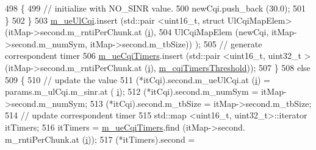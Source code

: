 \begin{DoxyCode}
498                                                 \{
499                                                         \textcolor{comment}{// initialize with NO\_SINR value.}
500                                                         newCqi.push\_back (30.0);
501                                                 \}
502                                         \}
503                                         \hyperlink{classns3_1_1MmWaveFlexTtiMaxRateMacScheduler_a6f9a468f0c48b60d9893fed1410d18cd}{m\_ueUlCqi}.insert (std::pair <uint16\_t, struct
       UlCqiMapElem> (itMap->second.m\_rntiPerChunk.at (\hyperlink{bernuolliDistribution_8m_a6f6ccfcf58b31cb6412107d9d5281426}{i}),
504                                                                                                      
      UlCqiMapElem (newCqi, itMap->second.m\_numSym, itMap->second.m\_tbSize)) );
505                                         \textcolor{comment}{// generate correspondent timer}
506                                         \hyperlink{classns3_1_1MmWaveFlexTtiMaxRateMacScheduler_ae82085e6dfdc301971569ea50a4eadd0}{m\_ueCqiTimers}.insert (std::pair <uint16\_t, uint32\_t > 
      (itMap->second.m\_rntiPerChunk.at (\hyperlink{bernuolliDistribution_8m_a6f6ccfcf58b31cb6412107d9d5281426}{i}), \hyperlink{classns3_1_1MmWaveFlexTtiMaxRateMacScheduler_a7f29b65f1e4a7c64cf73fe2efd02770f}{m\_cqiTimersThreshold}));
507                                 \}
508                                 \textcolor{keywordflow}{else}
509                                 \{
510                                         \textcolor{comment}{// update the value}
511                                         (*itCqi).second.m\_ueUlCqi.at (\hyperlink{bernuolliDistribution_8m_a6f6ccfcf58b31cb6412107d9d5281426}{i}) = params.m\_ulCqi.m\_sinr.at (
      \hyperlink{bernuolliDistribution_8m_a6f6ccfcf58b31cb6412107d9d5281426}{i});
512                                         (*itCqi).second.m\_numSym = itMap->second.m\_numSym;
513                                         (*itCqi).second.m\_tbSize = itMap->second.m\_tbSize;
514                                         \textcolor{comment}{// update correspondent timer}
515                                         std::map <uint16\_t, uint32\_t>::iterator itTimers;
516                                         itTimers = \hyperlink{classns3_1_1MmWaveFlexTtiMaxRateMacScheduler_ae82085e6dfdc301971569ea50a4eadd0}{m\_ueCqiTimers}.find (itMap->second.
      m\_rntiPerChunk.at (\hyperlink{bernuolliDistribution_8m_a6f6ccfcf58b31cb6412107d9d5281426}{i}));
517                                         (*itTimers).second = 

\end{DoxyCode}
